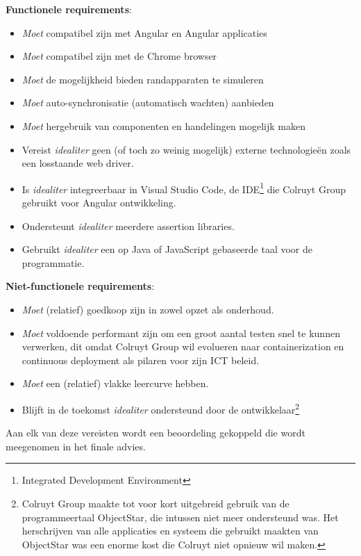 \textbf{Functionele requirements}:
\begin{itemize}
    \item \emph{Moet} compatibel zijn met Angular en Angular applicaties
    \item \emph{Moet} compatibel zijn met de Chrome browser
    \item \emph{Moet} de mogelijkheid bieden randapparaten te simuleren
    \item \emph{Moet} auto-synchronisatie (automatisch wachten) aanbieden
    \item \emph{Moet} hergebruik van componenten en handelingen mogelijk maken
    \item Vereist \emph{idealiter} geen (of toch zo weinig mogelijk) externe technologieën zoals een losstaande web driver.
    \item Is \emph{idealiter} integreerbaar in Visual Studio Code, de IDE\footnote{Integrated Development Environment} die Colruyt Group gebruikt voor Angular ontwikkeling.
    \item Ondersteunt \emph{idealiter} meerdere assertion libraries.
    \item Gebruikt \emph{idealiter} een op Java of JavaScript gebaseerde taal voor de programmatie.
\end{itemize}

\textbf{Niet-functionele requirements}:
\begin{itemize}
    \item \emph{Moet} (relatief) goedkoop zijn in zowel opzet als onderhoud.
    \item \emph{Moet} voldoende performant zijn om een groot aantal testen snel te kunnen verwerken, dit omdat Colruyt Group wil evolueren naar containerization en continuous deployment als pilaren voor zijn ICT beleid.
    \item \emph{Moet} een (relatief) vlakke leercurve hebben.
    \item Blijft in de toekomst \emph{idealiter} ondersteund door de ontwikkelaar\footnote{Colruyt Group maakte tot voor kort uitgebreid gebruik van de programmeertaal ObjectStar, die intussen niet meer ondersteund was. Het herschrijven van alle applicaties en systeem die gebruikt maakten van ObjectStar was een enorme kost die Colruyt niet opnieuw wil maken.}
\end{itemize}

Aan elk van deze vereisten wordt een beoordeling gekoppeld die wordt meegenomen in het finale advies.